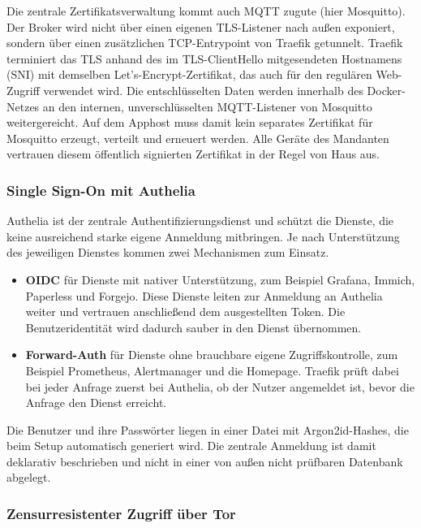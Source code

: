 Die zentrale Zertifikatsverwaltung kommt auch \ac{MQTT} zugute (hier
Mosquitto). Der Broker wird nicht über einen eigenen \ac{TLS}-Listener nach
außen exponiert, sondern über einen zusätzlichen \ac{TCP}-Entrypoint von
Traefik getunnelt. Traefik terminiert das \ac{TLS} anhand des im
\ac{TLS}-ClientHello mitgesendeten Hostnamens (\ac{SNI}) mit demselben
Let's-Encrypt-Zertifikat, das auch für den regulären Web-Zugriff verwendet
wird. Die entschlüsselten Daten werden innerhalb des Docker-Netzes an den
internen, unverschlüsselten \ac{MQTT}-Listener von Mosquitto weitergereicht.
Auf dem Apphost muss damit kein separates Zertifikat für Mosquitto erzeugt,
verteilt und erneuert werden. Alle Geräte des Mandanten vertrauen diesem
öffentlich signierten Zertifikat in der Regel von Haus aus.

\subsubsection{Single Sign-On mit Authelia}
\label{sec:apphost-authelia}
Authelia ist der zentrale Authentifizierungsdienst und schützt die Dienste,
die keine ausreichend starke eigene Anmeldung mitbringen. Je nach
Unterstützung des jeweiligen Dienstes kommen zwei Mechanismen zum Einsatz.

\begin{itemize}
  \item \textbf{\ac{OIDC}} für Dienste mit nativer Unterstützung, zum
    Beispiel Grafana, Immich, Paperless und Forgejo. Diese Dienste leiten zur
    Anmeldung an Authelia weiter und vertrauen anschließend dem ausgestellten
    Token. Die Benutzeridentität wird dadurch sauber in den Dienst
    übernommen.
  \item \textbf{Forward-Auth} für Dienste ohne brauchbare eigene
    Zugriffskontrolle, zum Beispiel Prometheus, Alertmanager und die
    Homepage. Traefik prüft dabei bei jeder Anfrage zuerst bei Authelia, ob
    der Nutzer angemeldet ist, bevor die Anfrage den Dienst erreicht.
\end{itemize}

Die Benutzer und ihre Passwörter liegen in einer Datei mit Argon2id-Hashes,
die beim Setup automatisch generiert wird. Die zentrale Anmeldung ist damit
deklarativ beschrieben und nicht in einer von außen nicht prüfbaren Datenbank
abgelegt.

\subsubsection{Zensurresistenter Zugriff über Tor} \label{sec:Tor}

